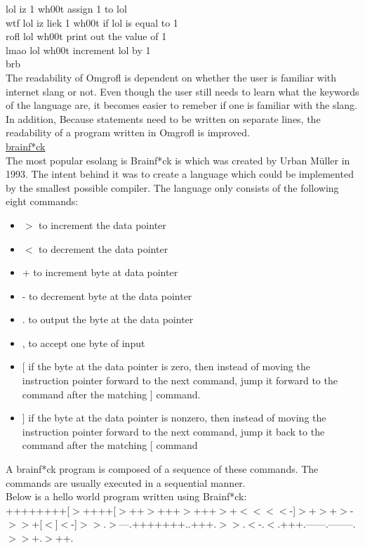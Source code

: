 \documentclass{article}
\begin{document}
\begin{enumerate}
    lol iz 1 wh00t assign 1 to lol\\
    wtf lol iz liek 1 wh00t if lol is equal to 1\\
    rofl lol wh00t print out the value of 1\\
    lmao lol wh00t increment lol by 1\\
    brb\\
    The readability of Omgrofl is dependent on whether the user is familiar with internet slang or not. Even though the user still needs to learn what the keywords of the language are, it becomes easier to remeber if one is familiar with the slang. In addition, Because statements need to be written on separate lines, the readability of a program written in Omgrofl is improved.
    \\ \underline{brainf*ck}\\ The most popular esolang is Brainf*ck is which was created by Urban M{\"u}ller in 1993. The intent behind it was to create a language which could be implemented by the smallest possible compiler. The language only consists of the following eight commands: \\
    \begin{itemize}
        \item $>$ to increment the data pointer
        \item $<$ to decrement the data pointer
        \item + to increment byte at data pointer
        \item - to decrement byte at the data pointer
        \item . to output the byte at the data pointer
        \item , to accept one byte of input
        \item $[$ if the byte at the data pointer is zero, then instead of moving the  instruction pointer forward to the next command, jump it forward to the command after the matching ] command.
        \item $]$ if the byte at the data pointer is nonzero, then instead of moving the instruction pointer forward to the next command, jump it back to the command after the matching [ command
    \end{itemize}
    A brainf*ck program is composed of a sequence of these commands. The commands are usually executed in a sequential manner.\\Below is a hello world program written using Brainf*ck:\\
    ++++++++[$>$++++[$>$++$>$+++$>$+++$>$+$<<<<$-]$>$+$>$+$>$-$>>$+[$<$]$<$-]$>>$.$>$---.+++++++..+++.$>>$.$<$-.$<$.+++.------.--------.$>>$+.$>$++.\\

\end{enumerate}
\end{document}
